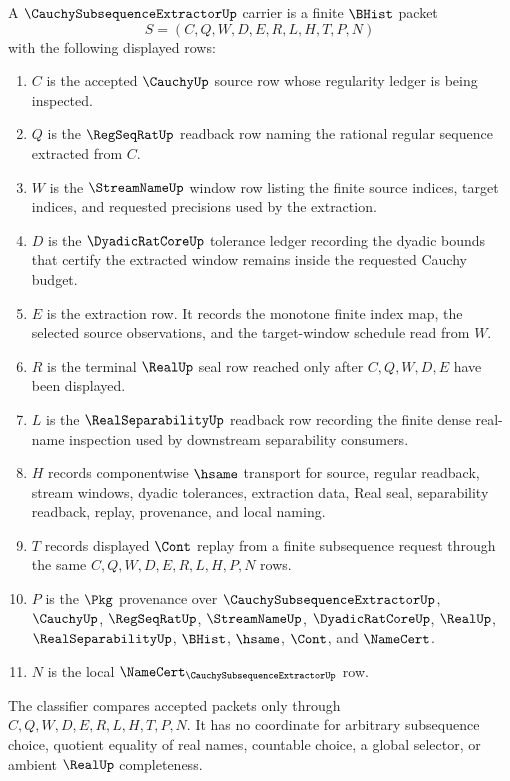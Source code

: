 \begin{definition}
\label{def:cauchy-subsequence-extractor-carrier}
A $\CauchySubsequenceExtractorUp$ carrier is a finite $\BHist$ packet
$$
S=(C,Q,W,D,E,R,L,H,T,P,N)
$$
with the following displayed rows:
\begin{enumerate}
\item $C$ is the accepted $\CauchyUp$ source row whose regularity ledger is being inspected.
\item $Q$ is the $\RegSeqRatUp$ readback row naming the rational regular sequence extracted from $C$.
\item $W$ is the $\StreamNameUp$ window row listing the finite source indices, target indices, and requested precisions used by the extraction.
\item $D$ is the $\DyadicRatCoreUp$ tolerance ledger recording the dyadic bounds that certify the extracted window remains inside the requested Cauchy budget.
\item $E$ is the extraction row. It records the monotone finite index map, the selected source observations, and the target-window schedule read from $W$.
\item $R$ is the terminal $\RealUp$ seal row reached only after $C,Q,W,D,E$ have been displayed.
\item $L$ is the $\RealSeparabilityUp$ readback row recording the finite dense real-name inspection used by downstream separability consumers.
\item $H$ records componentwise $\hsame$ transport for source, regular readback, stream windows, dyadic tolerances, extraction data, Real seal, separability readback, replay, provenance, and local naming.
\item $T$ records displayed $\Cont$ replay from a finite subsequence request through the same $C,Q,W,D,E,R,L,H,P,N$ rows.
\item $P$ is the $\Pkg$ provenance over $\CauchySubsequenceExtractorUp$, $\CauchyUp$, $\RegSeqRatUp$, $\StreamNameUp$, $\DyadicRatCoreUp$, $\RealUp$, $\RealSeparabilityUp$, $\BHist$, $\hsame$, $\Cont$, and $\NameCert$.
\item $N$ is the local $\NameCert_{\CauchySubsequenceExtractorUp}$ row.
\end{enumerate}
The classifier compares accepted packets only through $C,Q,W,D,E,R,L,H,T,P,N$. It has no coordinate for arbitrary subsequence choice, quotient equality of real names, countable choice, a global selector, or ambient $\RealUp$ completeness.
\end{definition}

